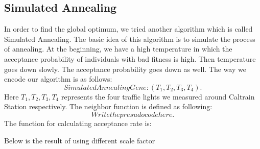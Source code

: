 \documentclass{article} %
\begin{document}
\subsection{Simulated Annealing}
In order to find the global optimum, we tried another algorithm which is called Simulated Annealing. The basic idea of this algorithm is to simulate the process of annealing. At the beginning, we have a high temperature in which the acceptance probability of individuals with bad fitness is high. Then temperature goes down slowly. The acceptance probability goes down as well. The way we encode our algorithm is as follows:
\begin{equation}
Simulated Annealing Gene:(T_1, T_2, T_3, T_4).
\end{equation}
Here $T_1, T_2, T_3, T_4$ represents the four traffic lights we measured around Caltrain Station respectively.
The neighbor function is defined as following:
\begin{equation}
Write the presudo code here.
\end{equation}
The function for calculating acceptance rate is:


Below is the result of using different scale factor 
\end{document}
